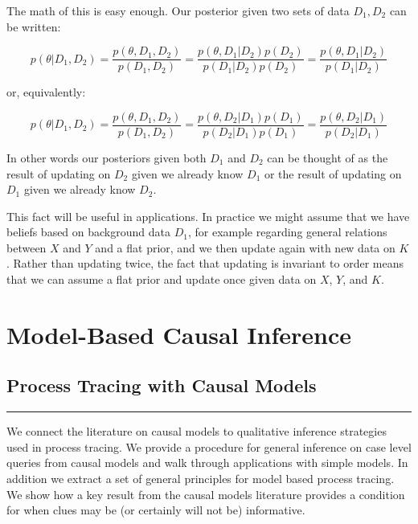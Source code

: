 \documentclass[12pt,]{book}
\begin{document}
The math of this is easy enough. Our posterior given two sets of data \(D_1, D_2\) can be written:

\[p(\theta | D_1, D_2) = \frac{p(\theta, D_1, D_2)}{p(D_1, D_2)} = \frac{p(\theta, D_1 | D_2)p(D_2)}{p(D_1 | D_2)p(D_2)}= \frac{p(\theta, D_1 | D_2)}{p(D_1 | D_2)}\]

or, equivalently:

\[p(\theta | D_1, D_2) = \frac{p(\theta, D_1, D_2)}{p(D_1, D_2)} = \frac{p(\theta, D_2 | D_1)p(D_1)}{p(D_2 | D_1)p(D_1)}= \frac{p(\theta, D_2 | D_1)}{p(D_2 | D_1)}\]

In other words our posteriors given both \(D_1\) and \(D_2\) can be thought of as the result of updating on \(D_2\) given we already know \(D_1\) or the result of updating on \(D_1\) given we already know \(D_2\).

This fact will be useful in applications. In practice we might assume that we have beliefs based on background data \(D_1\), for example regarding general relations between \(X\) and \(Y\) and a flat prior, and we then update again with new data on \(K\). Rather than updating twice, the fact that updating is invariant to order means that we can assume a flat prior and update once given data on \(X\), \(Y\), and \(K\).

\hypertarget{part-model-based-causal-inference}{%
\part{Model-Based Causal Inference}\label{part-model-based-causal-inference}}

\hypertarget{clues}{%
\chapter{Process Tracing with Causal Models}\label{clues}}

\begin{center}\rule{0.5\linewidth}{\linethickness}\end{center}

We connect the literature on causal models to qualitative inference strategies used in process tracing. We provide a procedure for general inference on case level queries from causal models and walk through applications with simple models. In addition we extract a set of general principles for model based process tracing. We show how a key result from the causal models literature provides a condition for when clues may be (or certainly will not be) informative.
\end{document}
